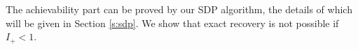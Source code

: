 \documentclass[conference]{IEEEtran}
\begin{document}
		The achievability part can be proved by our SDP algorithm, the details of which will be given in  Section \ref{s:sdp}.
		We show that exact recovery is not possible if $I_+ < 1$. %
		
\end{document}
